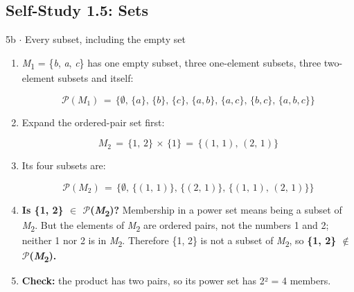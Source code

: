 \documentclass[11pt]{article}
\begin{document}
\begin{keepsection}\subsection{Self-Study 1.5: Sets}

\begin{workedbox}{5b \ensuremath{\cdot} Every subset, including the empty set}
\begin{enumerate}
\item {}
\textit{M}\textsubscript{1} = \{\textit{b}, \textit{a}, \textit{c}\} has one empty subset, three one-element subsets, three two-element subsets and itself:

\begin{equation*}\mathcal{P}({M}_{1})\, =\, \{\emptyset ,\, \{{a}\},\, \{{b}\},\, \{{c}\},\, \{{a},{b}\},\, \{{a},{c}\},\, \{{b},{c}\},\, \{{a},{b},{c}\}\}\end{equation*}
\item {}
Expand the ordered-pair set first:

\begin{equation*}{M}_{2}\, =\, \{1,\, 2\}\, \times \, \{1\}\, =\, \{(1,\, 1),\, (2,\, 1)\}\end{equation*}
\item {}
Its four subsets are:

\begin{equation*}\mathcal{P}({M}_{2})\, =\, \{\emptyset ,\, \{(1,\, 1)\},\, \{(2,\, 1)\},\, \{(1,\, 1),\, (2,\, 1)\}\}\end{equation*}
\item \textbf{Is \{1, 2\} \ensuremath{\in} \ensuremath{\mathcal{P}}(\textit{M}\textsubscript{2})?} Membership in a power set means being a subset of \textit{M}\textsubscript{2}. But the elements of \textit{M}\textsubscript{2} are ordered pairs, not the numbers 1 and 2; neither 1 nor 2 is in \textit{M}\textsubscript{2}. Therefore \{1, 2\} is not a subset of \textit{M}\textsubscript{2}, so \textbf{\{1, 2\} \ensuremath{\notin} \ensuremath{\mathcal{P}}(\textit{M}\textsubscript{2}).}
\item \textbf{Check:} the product has two pairs, so its power set has 2² = 4 members.
\end{enumerate}
\end{workedbox}

\end{keepsection}
\end{document}
